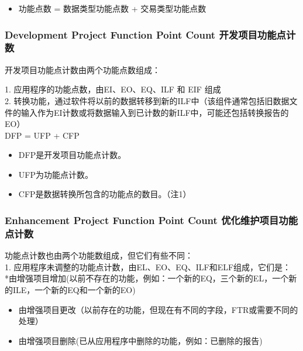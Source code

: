 \begin{itemize}
\tightlist
\item
  功能点数 = 数据类型功能点数 + 交易类型功能点数
\end{itemize}

\hypertarget{development-project-function-point-count-ux5f00ux53d1ux9879ux76eeux529fux80fdux70b9ux8ba1ux6570}{%
\subsubsection{Development Project Function Point Count
开发项目功能点计数}\label{development-project-function-point-count-ux5f00ux53d1ux9879ux76eeux529fux80fdux70b9ux8ba1ux6570}}

开发项目功能点计数由两个功能点数组成：

1. 应用程序的功能点数，由EI、EO、EQ、ILF 和 EIF 组成\\
2.
转换功能，通过软件将以前的数据转移到新的ILF中（该组件通常包括旧数据文件的输入作为EI计数或将数据输入到已计数的新ILF中，可能还包括转换报告的EO）\\

DFP = UFP + CFP

\begin{itemize}
\tightlist
\item
  DFP是开发项目功能点计数。
\item
  UFP为功能点计数。
\item
  CFP是数据转换所包含的功能点的数目。（注1）
\end{itemize}

\hypertarget{enhancement-project-function-point-count-ux4f18ux5316ux7ef4ux62a4ux9879ux76eeux529fux80fdux70b9ux8ba1ux6570}{%
\subsubsection{Enhancement Project Function Point Count
优化维护项目功能点计数}\label{enhancement-project-function-point-count-ux4f18ux5316ux7ef4ux62a4ux9879ux76eeux529fux80fdux70b9ux8ba1ux6570}}

功能点计数也由两个功能数组成，但它们有些不同：\\
1. 应用程序未调整的功能点计数，由EL、EO、EQ、ILF和ELF组成，它们是：\\
*由增强项目增加(以前不存在的功能，例如：一个新的EQ，三个新的EL，一个新的ILE，一个新的EQ和一个新的EO)

\begin{itemize}
\tightlist
\item
  由增强项目更改（以前存在的功能，但现在有不同的字段，FTR或需要不同的处理）
\item
  由增强项目删除(已从应用程序中删除的功能，例如：已删除的报告)
\end{itemize}

